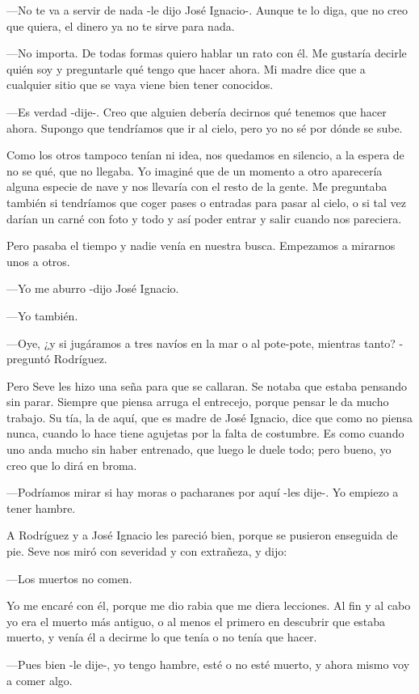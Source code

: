 \documentclass{barcodevapor3pags}
\begin{document}
---No te va a servir de nada -le dijo José Ignacio-. Aunque te lo diga,
que no creo que quiera, el dinero ya no te sirve para nada.~

---No importa. De todas formas quiero hablar un rato con él. Me gustaría
decirle quién soy y preguntarle qué tengo que hacer ahora. Mi madre dice
que a cualquier sitio que se vaya viene bien tener conocidos.~

---Es verdad -dije-. Creo que alguien debería decirnos qué tenemos que
hacer ahora. Supongo que tendríamos que ir al cielo, pero yo no sé por
dónde se sube.~

Como los otros tampoco tenían ni idea, nos quedamos en silencio, a la
espera de no se qué, que no llegaba. Yo imaginé que de un momento a otro
aparecería alguna especie de nave y nos llevaría con el resto de la
gente. Me preguntaba también si tendríamos que coger pases o entradas
para pasar al cielo, o si tal vez darían un carné con foto y todo y así
poder entrar y salir cuando nos pareciera.~

Pero pasaba el tiempo y nadie venía en nuestra busca. Empezamos a
mirarnos unos a otros.~

---Yo me aburro -dijo José Ignacio.~

---Yo también.~

---Oye, ¿y si jugáramos a tres navíos en la mar o al pote-pote, mientras
tanto? -preguntó Rodríguez.~

Pero Seve les hizo una seña para que se callaran. Se notaba que estaba
pensando sin parar. Siempre que piensa arruga el entrecejo, porque
pensar le da mucho trabajo. Su tía, la de aquí, que es madre de José
Ignacio, dice que como no piensa nunca, cuando lo hace tiene agujetas
por la falta de costumbre. Es como cuando uno anda mucho sin haber
entrenado, que luego le duele todo; pero bueno, yo creo que lo dirá en
broma.~

---Podríamos mirar si hay moras o pacharanes por aquí -les dije-. Yo
empiezo a tener hambre.~

A Rodríguez y a José Ignacio les pareció bien, porque se pusieron
enseguida de pie. Seve nos miró con severidad y con extrañeza, y dijo:~

---Los muertos no comen.~

Yo me encaré con él, porque me dio rabia que me diera lecciones. Al fin
y al cabo yo era el muerto más antiguo, o al menos el primero en
descubrir que estaba muerto, y venía él a decirme lo que tenía o no
tenía que hacer.~

---Pues bien -le dije-, yo tengo hambre, esté o no esté muerto, y ahora
mismo voy a comer algo.~
\end{document}

